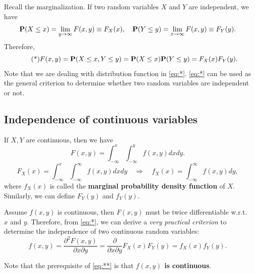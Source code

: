 Recall the marginalization. If two random variables $X$ and $Y$ are independent, we have
\begin{equation*}
    \mathbf{P}(X\leq x) = \lim_{y\to\infty}F(x, y) \equiv F_X(x), \quad 
    \mathbf{P}(Y \leq y) = \lim_{x\to\infty}F(x, y) \equiv F_Y(y).
\end{equation*}
Therefore,
\begin{equation}
    \label{eq:*}
    \tag{*}
    F(x,y) = \mathbf{P}(X \leq x, Y \leq y) = \mathbf{P}(X\leq x) \mathbf{P}(Y \leq y) = F_X(x) F_Y(y). 
\end{equation}
Note that we are dealing with distribution function in \eqref{eq:*}. \eqref{eq:*} can be used as the general criterion to determine whether two random variables are independent or not.

\subsection{Independence of continuous variables}
If $X, Y$ are continuous, then we have
\begin{equation*}
    F(x, y) = \int_{-\infty}^x \int_{-\infty}^y f(x,y) dx dy.
\end{equation*}
\begin{equation*}
    F_X(x) = \int_{-\infty}^x \int_{-\infty}^\infty f(x, y)dx dy \quad \Rightarrow \quad f_X(x) = \int_{-\infty}^\infty f(x,y)dy,
\end{equation*}
where $f_X(x)$ is called the \textbf{marginal probability density function} of $X$. Similarly, we can define $F_Y(y)$ and $f_Y(y)$.

Assume $f(x,y)$ is continuous, then $F(x,y)$ must be twice differentiable w.r.t. $x$ and $y$. Therefore, from \eqref{eq:*}, we can derive a \emph{very practical criterion} to determine the independence of two continuous random variables:
\begin{equation}
    \label{eq:**}
    \tag{**}
    f(x,y) = \frac{\partial^2 F(x,y)}{\partial x \partial y} = \frac{\partial}{\partial x \partial y} F_X(x) F_Y(y) = f_X(x) f_Y(y).
\end{equation}

\begin{remark}
Note that the prerequisite of \eqref{eq:**} is that \textbf{$f(x,y)$ is continuous}.
\end{remark}

